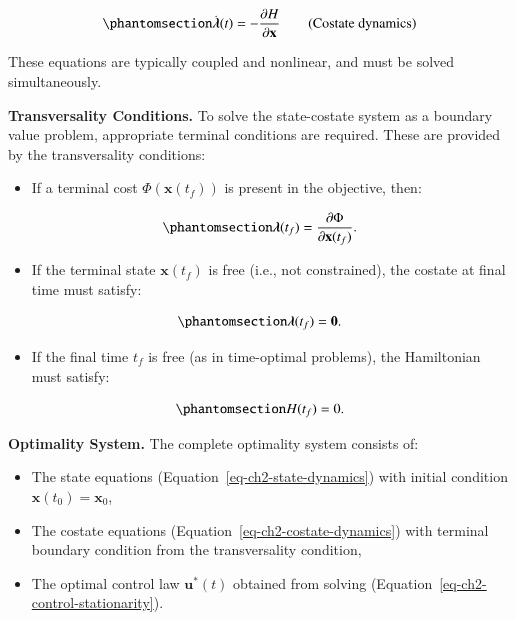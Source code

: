\documentclass[
  number,
  preprint]{elsarticle}
\providecommand{\tightlist}{%
  \setlength{\itemsep}{0pt}\setlength{\parskip}{0pt}}
\begin{document}
\begin{equation}\protect\phantomsection\label{eq-ch2-costate-dynamics}{
\dot{\boldsymbol{\lambda}}(t) = -\frac{\partial H}{\partial \mathbf{x}} \tag{Costate dynamics}
}\end{equation}

These equations are typically coupled and nonlinear, and must be solved
simultaneously.

\textbf{Transversality Conditions.} To solve the state-costate system as
a boundary value problem, appropriate terminal conditions are required.
These are provided by the transversality conditions:

\begin{itemize}
\tightlist
\item
  If a terminal cost \(\Phi(\mathbf{x}(t_f))\) is present in the
  objective, then:
\end{itemize}

\begin{equation}\protect\phantomsection\label{eq-ch2-costate-boundary}{
\boldsymbol{\lambda}(t_f) = \frac{\partial \Phi}{\partial \mathbf{x}(t_f)}.
}\end{equation}

\begin{itemize}
\tightlist
\item
  If the terminal state \(\mathbf{x}(t_f)\) is free (i.e., not
  constrained), the costate at final time must satisfy:
\end{itemize}

\begin{equation}\protect\phantomsection\label{eq-ch2-free-terminal-state}{
\boldsymbol{\lambda}(t_f) = \mathbf{0}.
}\end{equation}

\begin{itemize}
\tightlist
\item
  If the final time \(t_f\) is free (as in time-optimal problems), the
  Hamiltonian must satisfy:
\end{itemize}

\begin{equation}\protect\phantomsection\label{eq-ch2-free-final-time}{
H(t_f) = 0.
}\end{equation}

\textbf{Optimality System.} The complete optimality system consists of:

\begin{itemize}
\tightlist
\item
  The state equations (Equation~\ref{eq-ch2-state-dynamics}) with
  initial condition \(\mathbf{x}(t_0) = \mathbf{x}_0\),
\item
  The costate equations (Equation~\ref{eq-ch2-costate-dynamics}) with
  terminal boundary condition from the transversality condition,
\item
  The optimal control law \(\mathbf{u}^*(t)\) obtained from solving
  (Equation~\ref{eq-ch2-control-stationarity}).
\end{itemize}
\end{document}
